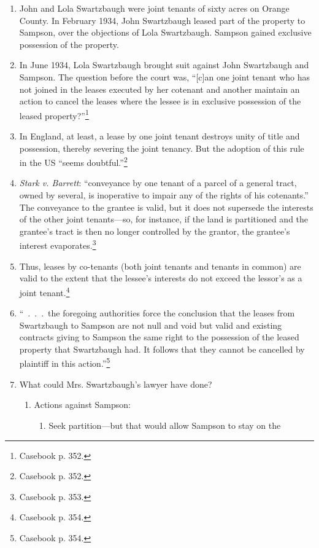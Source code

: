 \begin{enumerate}
    \item John and Lola Swartzbaugh were joint tenants of sixty acres on 
    Orange County. In February 1934, John Swartzbaugh leased part of the 
    property to Sampson, over the objections of Lola Swartzbaugh. Sampson 
    gained exclusive possession of the property.
    \item In June 1934, Lola Swartzbaugh brought suit against John Swartzbaugh 
    and Sampson. The question before the court was, ``[c]an one joint tenant 
    who has not joined in the leases executed by her cotenant and another 
    maintain an action to cancel the leases where the lessee is in exclusive 
    possession of the leased property?''\footnote{Casebook p. 352.}
    \item In England, at least, a lease by one joint tenant destroys unity of 
    title and possession, thereby severing the joint tenancy. But the adoption 
    of this rule in the US ``seems doubtful.''\footnote{Casebook p. 352.}
    \item \emph{Stark v. Barrett}: ``conveyance by one tenant of a parcel of a 
    general tract, owned by several, is inoperative to impair any of the 
    rights of his cotenants.'' The conveyance to the grantee is valid, but it 
    does not supersede the interests of the other joint tenants---so, for 
    instance, if the land is partitioned and the grantee's tract is then no 
    longer controlled by the grantor, the grantee's interest 
    evaporates.\footnote{Casebook p. 353.}
    \item Thus, leases by co-tenants (both joint tenants and tenants in 
    common) are valid to the extent that the lessee's interests do not exceed 
    the lessor's as a joint tenant.\footnote{Casebook p. 354.}
    \item ``~.~.~.~the foregoing authorities force the conclusion that the 
    leases from Swartzbaugh to Sampson are not null and void but valid and 
    existing contracts giving to Sampson the same right to the possession of 
    the leased property that Swartzbaugh had. It follows that they cannot be 
    cancelled by plaintiff in this action.''\footnote{Casebook p. 354.}
    \item What could Mrs. Swartzbaugh's lawyer have done?
    \begin{enumerate}
        \item Actions against Sampson:
        \begin{enumerate}
            \item Seek partition---but that would allow Sampson to stay on the 

\end{enumerate}
\end{enumerate}
\end{enumerate}
